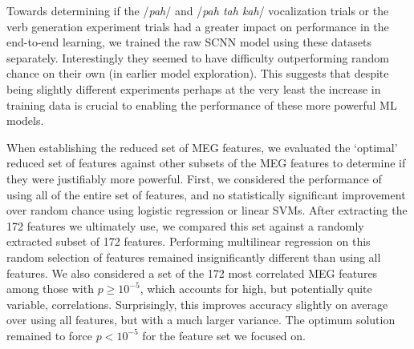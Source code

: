 \documentclass[fleqn,10pt]{wlscirep}
\begin{document}
Towards determining if the /{\em pah}/ and /{\em pah tah kah}/ vocalization trials or the verb generation experiment trials had a greater impact on performance in the end-to-end learning, we trained the raw SCNN model using these datasets separately. Interestingly they seemed to have difficulty outperforming random chance on their own (in earlier model exploration). This suggests that despite being slightly different experiments perhaps at the very least the increase in training data is crucial to enabling the performance of these more powerful ML models.

When establishing the reduced set of MEG features, we evaluated the `optimal' reduced set of features against other subsets of the MEG features to determine if they were justifiably more powerful. First, we considered the performance of using all of the entire set of features, and no statistically significant improvement over random chance using logistic regression or linear SVMs. After extracting the 172 features we ultimately use, we compared this set against a randomly extracted subset of 172 features. Performing multilinear regression on this random selection of features remained insignificantly different than using all features. We also considered a set of the 172 most correlated MEG features among those with $p \geq 10^{-5}$, which accounts for high, but potentially quite variable, correlations. Surprisingly, this improves accuracy slightly on average over using all features, but with a much larger variance. The optimum solution remained to force $p<10^{-5}$ for the feature set we focused on. %

\end{document}
